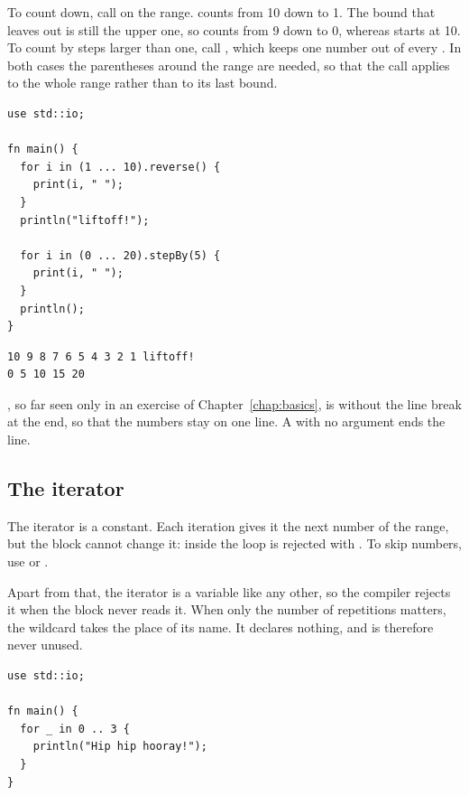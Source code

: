 To count down, call  on the range. 
counts from 10 down to 1. The bound that  leaves out is still the
upper one, so  counts from 9 down to 0, whereas
 starts at 10. To count by steps larger than one,
call , which keeps one number out of every . In both
cases the parentheses around the range are needed, so that the call applies to
the whole range rather than to its last bound.

\begin{lstlisting}[style=coloredverbatim, caption=Counting down and by steps, label=lst:control:for_reverse]
use std::io;

fn main() {
  for i in (1 ... 10).reverse() {
    print(i, " ");
  }
  println("liftoff!");

  for i in (0 ... 20).stepBy(5) {
    print(i, " ");
  }
  println();
}
\end{lstlisting}
\vspace{-10pt}%
\begin{lstlisting}[style=bashVerb]
10 9 8 7 6 5 4 3 2 1 liftoff!
0 5 10 15 20
\end{lstlisting}

, so far seen only in an exercise of Chapter~\ref{chap:basics}, is
 without the line break at the end, so that the numbers stay on one line. A  with
no argument ends the line.

\subsection{The iterator}

The iterator is a constant. Each iteration gives it the next number of the
range, but the block cannot change it:  inside the loop is
rejected with . To skip numbers, use  or .

Apart from that, the iterator is a variable like any other, so the compiler rejects it when
the block never reads it. When only the number of repetitions matters, the
wildcard \token{\_} takes the place of its name. It declares nothing, and is
therefore never unused.

\begin{lstlisting}[style=coloredverbatim, caption=Repeating without reading the iterator, label=lst:control:for_wildcard]
use std::io;

fn main() {
  for _ in 0 .. 3 {
    println("Hip hip hooray!");
  }
}
\end{lstlisting}

